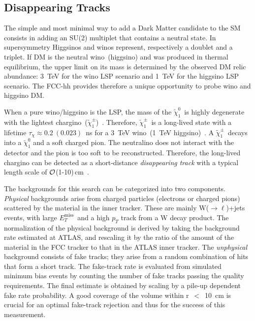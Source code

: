 \documentclass[11pt,twoside,a4paper]{cernrep}
\begin{document}
\subsection{Disappearing Tracks}
The simple and most minimal way to add a Dark Matter candidate to the SM consists in adding an SU(2) multiplet that contains a neutral state. In supersymmetry Higgsinos and winos represent, respectively a doublet and a triplet. If DM is the neutral wino~(higgsino) and was produced in thermal equilibrium, the upper limit on its mass is determined by the observed DM relic abundance: 3~TeV for the wino LSP scenario and 1~TeV for the higgsino LSP scenario. The FCC-hh provides therefore a unique opportunity to probe wino and higgsino DM.

When a pure wino/higgsino is the LSP, the mass of the \ensuremath{\tilde{\chi}_{1}^{0}}~is highly degenerate with the lightest chargino~(\ensuremath{\tilde{\chi}_{1}^{\pm}})~\cite{Ibe:2012sx,Thomas:1998wy}.
Therefore, \ensuremath{\tilde{\chi}_{1}^{\pm}}~is a long-lived state with a lifetime $\tau_{\chi}\approx 0.2~(0.023)$~ns for a 3~TeV wino~(1~TeV higgsino)~\cite{Barr:2002ex}.
A \ensuremath{\tilde{\chi}_{1}^{\pm}}~decays into a \ensuremath{\tilde{\chi}_{1}^{0}} and a soft charged pion. The neutralino does not interact with the detector and the pion is too soft to be reconstructed. Therefore, the long-lived chargino can be detected as a short-distance \emph{disappearing track} with a typical length scale of $\cal{O}$(1-10)\,cm~\cite{Chen:1996ap,Chen:1999yf,Asai:2008sk}.

The backgrounds for this search can be categorized into two components.
\emph{Physical} backgrounds arise from charged particles (electrons or charged pions) scattered by the material in the inner tracker. These are mainly W($\rightarrow \ell$\textnu)+jets events, with large $E_T^{\mathrm{miss}}$~and a high $p_{T}$ track from a W decay product. The normalization of the physical background is derived by taking the background rate estimated at ATLAS, and rescaling it by the ratio of the amount of the material in the FCC tracker to that in the ATLAS inner tracker. The \emph{unphysical} background consists of fake tracks; they arise from a random combination of hits that form a short track. The fake-track rate is evaluated from simulated minimum bias events by counting the number of fake tracks passing the quality requirements. The final estimate is obtained by scaling by a pile-up dependent fake rate probability. A good coverage of the volume within r~$<$~10~cm is crucial for an optimal fake-track rejection and thus for the success of this measurement.
\end{document}
